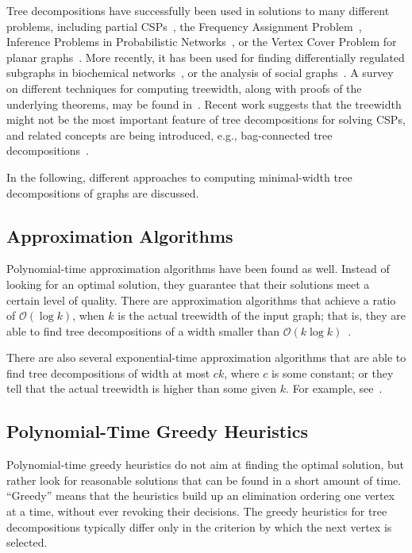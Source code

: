 \documentclass[thesis.tex]{subfiles}
\begin{document}
   Tree decompositions have successfully been used in solutions to many different problems, including partial \glspl{CSP}~\parencite{NET:NET10046}, the Frequency Assignment Problem~\parencite{kolenkoster99}, Inference Problems in Probabilistic Networks~\parencite{lauritzen1988local}, or the Vertex Cover Problem for planar graphs~\parencite{Alber2005219}. More recently, it has been used for finding differentially regulated subgraphs in biochemical networks~\parencite{hildebrandtalgorithms}, or the analysis of social graphs~\parencite{adcock2014tree}. 
   A survey on different techniques for computing treewidth, along with proofs of the underlying theorems, may be found in~\parencite{Bodlaender2010259}. Recent work suggests that the treewidth might not be the most important feature of tree decompositions for solving \glspl{CSP}, and related concepts are being introduced, e.g., bag-connected tree decompositions~\parencite{jegou2014tree}.

In the following, different approaches to computing minimal-width tree decompositions of graphs are discussed.

\subsection{Approximation Algorithms}
Polynomial-time approximation algorithms have been found as well. Instead of looking for an optimal solution, they guarantee that their solutions meet a certain level of quality. There are approximation algorithms that achieve a ratio of $\mathcal{O}(\log k)$, when $k$ is the actual treewidth of the input graph; that is, they are able to find tree decompositions of a width smaller than $\mathcal{O}(k\log k)$~\parencite{Amir:2001:EAT:2074022.2074024,Bouchitté2004183}.

There are also several exponential-time approximation algorithms that are able to find tree decompositions of width at most $ck$, where $c$ is some constant; or they tell that the actual treewidth is higher than some given $k$. For example, see~\parencite{Amir:2001:EAT:2074022.2074024,Becker20013,Lagergren199620}.

\subsection{Polynomial-Time Greedy Heuristics}
Polynomial-time greedy heuristics do not aim at finding the optimal solution, but rather look for reasonable solutions that can be found in a short amount of time. \enquote{Greedy} means that the heuristics build up an elimination ordering one vertex at a time, without ever revoking their decisions. The greedy heuristics for tree decompositions typically differ only in the criterion by which the next vertex is selected.
\end{document}
